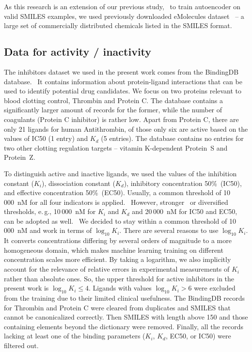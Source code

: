\documentclass[12pt]{article}
\begin{document}
As this research is an extension of our previous study,~\cite{Druchok2021b} to train autoencoder on valid SMILES examples, we used previously downloaded eMolecules dataset~\cite{eMolecules} -- a large set of commercially distributed chemicals listed in the SMILES format.


\subsection*{\sffamily \large Data for activity / inactivity}

The inhibitors dataset we used in the present work comes from the BindingDB database.~\cite{BindingDB:www,Chen2001,Chen2002b,Liu2007,Gilson2015}
It contains information about protein-ligand interactions that can be used to identify potential drug candidates.
We focus on two proteins relevant to blood clotting control, Thrombin and Protein C.
The database contains a significantly larger amount of records for the former, while the number of coagulants (Protein C inhibitor) is rather low. 
Apart from Protein C, there are only 21 ligands for human Antithrombin, of those only six are active based on the values of IC50 (1 entry) and $K_d$ (5 entries).
The database contains no entries for two other clotting regulation targets -- vitamin K-dependent Protein~S and Protein~Z.

To distinguish active and inactive ligands, we used the values of the inhibition constant ($K_i$), dissociation constant ($K_d$), inhibitory concentration 50\%~(IC50), and effective concentration 50\%~(EC50). 
Usually, a common threshold of 10\,000~nM for all four indicators is applied.~\cite{Lee2017,Kowalewski2020,Shim2021,Druchok2021}
However, stronger~\cite{Lee2019} or diversified thresholds, e.\,g., 10\,000~nM for $K_i$ and $K_d$ and 20\,000~nM for IC50 and EC50, can be adopted as well.~\cite{Chan2020} 
We decided to stay within a common threshold of 10\,000~nM and work in terms of $\log_{10}K_i$.
There are several reasons to use $\log_{10}K_i$.
It converts concentrations differing by several orders of magnitude to a more homogeneous domain, which makes machine learning training on different concentration scales more efficient.
By taking a logarithm, we also implicitly account for the relevance of relative errors in experimental measurements of $K_i$ rather than absolute ones.
So, the upper threshold for active inhibitors in the present work is $\log_{10}K_i \leq 4$.
Ligands with values $\log_{10}K_i > 6$ were excluded from the training due to their limited clinical usefulness.
The BindingDB records for Thrombin and Protein C were cleared from duplicates and SMILES that cannot be canonicalized correctly.
Then SMILES with length above 150 and those containing elements beyond the dictionary were removed.
Finally, all the records lacking at least one of the binding parameters ($K_i$, $K_d$, EC50, or IC50) were filtered out.
\end{document}
